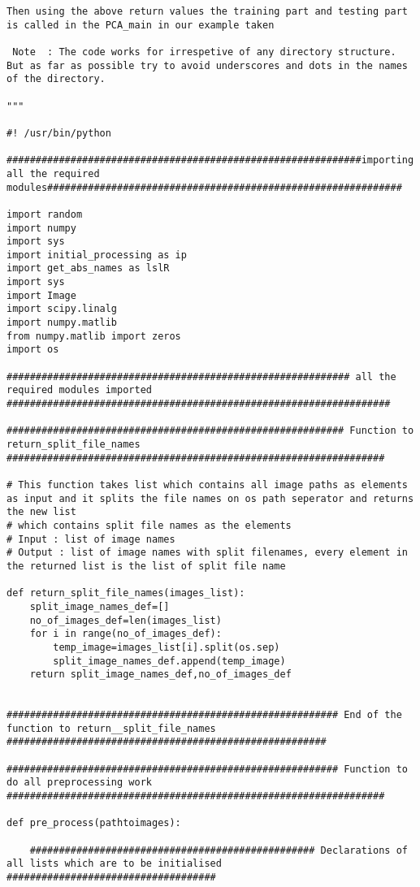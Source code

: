 \documentclass[10pt,a4paper]{article}
\begin{document}
\begin{lstlisting}
Then using the above return values the training part and testing part is called in the PCA_main in our example taken
		
 Note  : The code works for irrespetive of any directory structure. But as far as possible try to avoid underscores and dots in the names of the directory.	

"""

#! /usr/bin/python

#############################################################importing all the required modules#############################################################

import random
import numpy
import sys
import initial_processing as ip
import get_abs_names as lslR
import sys
import Image
import scipy.linalg
import numpy.matlib
from numpy.matlib import zeros
import os

########################################################### all the required modules imported ##################################################################

########################################################## Function to return_split_file_names #################################################################

# This function takes list which contains all image paths as elements as input and it splits the file names on os path seperator and returns the new list 
# which contains split file names as the elements
# Input : list of image names
# Output : list of image names with split filenames, every element in the returned list is the list of split file name

def return_split_file_names(images_list):
	split_image_names_def=[]
	no_of_images_def=len(images_list)
	for i in range(no_of_images_def):
		temp_image=images_list[i].split(os.sep)
		split_image_names_def.append(temp_image)
	return split_image_names_def,no_of_images_def


######################################################### End of the function to return__split_file_names #######################################################

######################################################### Function to do all preprocessing work #################################################################

def pre_process(pathtoimages):
	
	################################################# Declarations of all lists which are to be initialised ####################################
	

\end{lstlisting}
\end{document}
